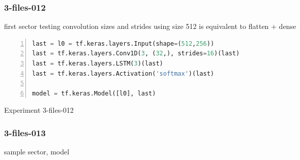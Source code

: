 \subsubsection{3-files-012}


first sector
testing convolution sizes and strides
using size 512 is equivalent to flatten + dense




\noindent
\begin{algorithm}
\begin{lstlisting}[language=Python, frame=single, numbers=left]
last = l0 = tf.keras.layers.Input(shape=(512,256))
last = tf.keras.layers.Conv1D(3, (32,), strides=16)(last)
last = tf.keras.layers.LSTM(3)(last)
last = tf.keras.layers.Activation('softmax')(last)

model = tf.keras.Model([l0], last)
\end{lstlisting}
\caption{\label{alg:3-files-012}Experiment 3-files-012}
\end{algorithm}

\subsubsection{3-files-013}

sample sector, model


